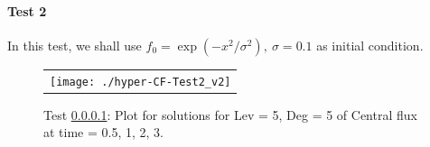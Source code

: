 \documentclass[final,leqno]{siamltex704}
\begin{document}
\paragraph{Test 2}\label{Num-3}
In this test, we shall use $f_0=\exp(-x^2/\sigma^2),\ \sigma=0.1$ as initial condition. 


%
%

\begin{figure}
\centering
\begin{tabular}{c}
  \texttt{[image: ./hyper-CF-Test2\_v2]}
  \end{tabular}
\caption{Test \ref{Num-3}: Plot for solutions for Lev = 5, Deg = 5 of Central flux at time = 0.5, 1, 2, 3.}
\end{figure}


\end{document}
